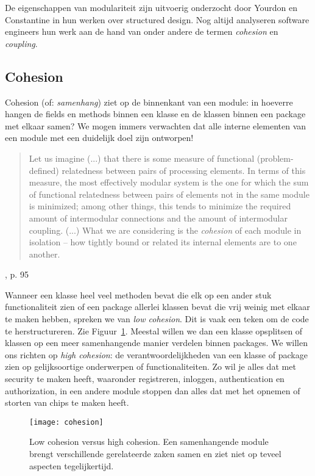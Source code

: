 De eigenschappen van modulariteit zijn uitvoerig onderzocht door
Yourdon en Constantine in hun werken over structured design.
Nog altijd analyseren software engineers hun werk aan de hand
van onder andere de termen \emph{cohesion} en \emph{coupling}.

\subsection{Cohesion}
Cohesion (of: \emph{samenhang}) ziet op de binnenkant van een module:
in hoeverre hangen de fields en methods binnen een klasse en de 
klassen binnen een package met elkaar samen?
We mogen immers verwachten dat alle interne elementen van een module 
met een duidelijk doel zijn ontworpen!
\blockquote{
Let us imagine (...) that there is some measure of 
functional (problem-defined) relatedness between pairs
of processing elements. In terms of this measure,
the most effectively modular system is the one for which
the sum of functional relatedness between pairs of elements
not in the same module is minimized; among other things, this
tends to minimize the required amount of intermodular connections
and the amount of intermodular coupling.
\newline\newline
(...)
\newline\newline
What we are considering is the \emph{cohesion} of each module
in isolation -- how tightly bound or related its internal elements
are to one another.
}{\cite{YourdonConstantine1979}, p. 95}

Wanneer een klasse heel veel methoden bevat die elk op een ander stuk
functionaliteit zien of een package allerlei klassen bevat die vrij weinig
met elkaar te maken hebben, spreken we van \emph{low cohesion}. Dit is vaak
een teken om de code te herstructureren. Zie Figuur~\ref{fig:cohesion}.
Meestal willen we dan een klasse opsplitsen
of klassen op een meer samenhangende manier verdelen binnen packages.
We willen ons richten op \emph{high cohesion}: de verantwoordelijkheden van een
klasse of package zien op gelijksoortige onderwerpen of functionaliteiten.
Zo wil je alles dat met security te maken heeft, 
waaronder registreren, inloggen, authentication en authorization,
in een andere module stoppen dan alles dat met het 
opnemen of storten van chips te maken heeft.

\begin{figure}[H]
    \centering
    \texttt{[image: cohesion]}
    \caption{Low cohesion versus high cohesion.
    Een samenhangende module brengt verschillende gerelateerde zaken samen 
    en ziet niet op teveel aspecten tegelijkertijd.}
    \label{fig:cohesion}
\end{figure}

